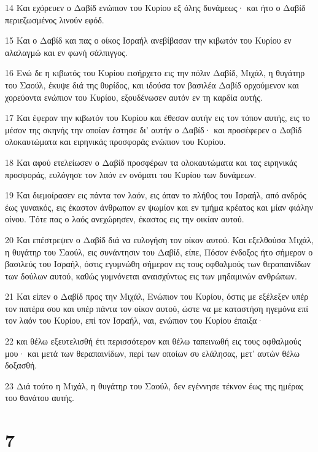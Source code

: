 \par 14 Και εχόρευεν ο Δαβίδ ενώπιον του Κυρίου εξ όλης δυνάμεως· και ήτο ο Δαβίδ περιεζωσμένος λινούν εφόδ.
\par 15 Και ο Δαβίδ και πας ο οίκος Ισραήλ ανεβίβασαν την κιβωτόν του Κυρίου εν αλαλαγμώ και εν φωνή σάλπιγγος.
\par 16 Ενώ δε η κιβωτός του Κυρίου εισήρχετο εις την πόλιν Δαβίδ, Μιχάλ, η θυγάτηρ του Σαούλ, έκυψε διά της θυρίδος, και ιδούσα τον βασιλέα Δαβίδ ορχούμενον και χορεύοντα ενώπιον του Κυρίου, εξουδένωσεν αυτόν εν τη καρδία αυτής.
\par 17 Και έφεραν την κιβωτόν του Κυρίου και έθεσαν αυτήν εις τον τόπον αυτής, εις το μέσον της σκηνής την οποίαν έστησε δι' αυτήν ο Δαβίδ· και προσέφερεν ο Δαβίδ ολοκαυτώματα και ειρηνικάς προσφοράς ενώπιον του Κυρίου.
\par 18 Και αφού ετελείωσεν ο Δαβίδ προσφέρων τα ολοκαυτώματα και τας ειρηνικάς προσφοράς, ευλόγησε τον λαόν εν ονόματι του Κυρίου των δυνάμεων.
\par 19 Και διεμοίρασεν εις πάντα τον λαόν, εις άπαν το πλήθος του Ισραήλ, από ανδρός έως γυναικός, εις έκαστον άνθρωπον εν ψωμίον και εν τμήμα κρέατος και μίαν φιάλην οίνου. Τότε πας ο λαός ανεχώρησεν, έκαστος εις την οικίαν αυτού.
\par 20 Και επέστρεψεν ο Δαβίδ διά να ευλογήση τον οίκον αυτού. Και εξελθούσα Μιχάλ, η θυγάτηρ του Σαούλ, εις συνάντησιν του Δαβίδ, είπε, Πόσον ένδοξος ήτο σήμερον ο βασιλεύς του Ισραήλ, όστις εγυμνώθη σήμερον εις τους οφθαλμούς των θεραπαινίδων των δούλων αυτού, καθώς γυμνόνεται αναισχύντως εις των μηδαμινών ανθρώπων.
\par 21 Και είπεν ο Δαβίδ προς την Μιχάλ, Ενώπιον του Κυρίου, όστις με εξέλεξεν υπέρ τον πατέρα σου και υπέρ πάντα τον οίκον αυτού, ώστε να με καταστήση ηγεμόνα επί τον λαόν του Κυρίου, επί τον Ισραήλ, ναι, ενώπιον του Κυρίου έπαιξα·
\par 22 και θέλω εξευτελισθή έτι περισσότερον και θέλω ταπεινωθή εις τους οφθαλμούς μου· και μετά των θεραπαινίδων, περί των οποίων συ ελάλησας, μετ' αυτών θέλω δοξασθή.
\par 23 Διά τούτο η Μιχάλ, η θυγάτηρ του Σαούλ, δεν εγέννησε τέκνον έως της ημέρας του θανάτου αυτής.

\chapter{7}

